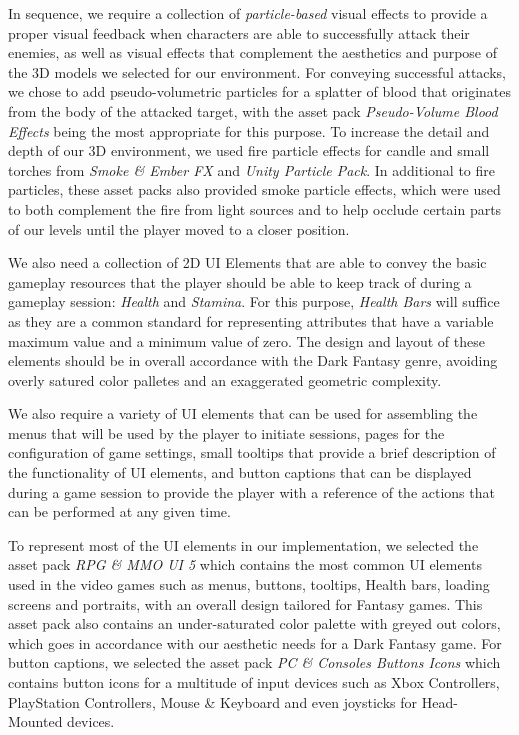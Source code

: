 
In sequence, we require a collection of \emph{particle-based} visual effects to provide a proper visual feedback when characters are able to successfully attack their enemies, as well as visual effects that complement the aesthetics and purpose of the 3D models we selected for our environment. For conveying successful attacks, we chose to add pseudo-volumetric particles for a splatter of blood that originates from the body of the attacked target, with the asset pack \emph{Pseudo-Volume Blood Effects} being the most appropriate for this purpose. To increase the detail and depth of our 3D environment, we used fire particle effects for candle and small torches from \emph{Smoke \& Ember FX} and \emph{Unity Particle Pack}. In additional to fire particles, these asset packs also provided smoke particle effects, which were used to both complement the fire from light sources and to help occlude certain parts of our levels until the player moved to a closer position.

We also need a collection of 2D UI Elements that are able to convey the basic gameplay resources that the player should be able to keep track of during a gameplay session: \emph{Health} and \emph{Stamina}. For this purpose, \emph{Health Bars} will suffice as they are a common standard for representing attributes that have a variable maximum value and a minimum value of zero. The design and layout of these elements should be in overall accordance with the Dark Fantasy genre, avoiding overly satured color palletes and an exaggerated geometric complexity.

We also require a variety of UI elements that can be used for assembling the menus that will be used by the player to initiate sessions, pages for the configuration of game settings, small tooltips that provide a brief description of the functionality of UI elements, and button captions that can be displayed during a game session to provide the player with a reference of the actions that can be performed at any given time.

To represent most of the UI elements in our implementation, we selected the asset pack \emph{RPG \& MMO UI 5} which contains the most common UI elements used in the video games such as menus, buttons, tooltips, Health bars, loading screens and portraits, with an overall design tailored for Fantasy games. This asset pack also contains an under-saturated color palette with greyed out colors, which goes in accordance with our aesthetic needs for a Dark Fantasy game. For button captions, we selected the asset pack \emph{PC \& Consoles Buttons Icons} which contains button icons for a multitude of input devices such as Xbox Controllers, PlayStation Controllers, Mouse \& Keyboard and even joysticks for Head-Mounted devices.

